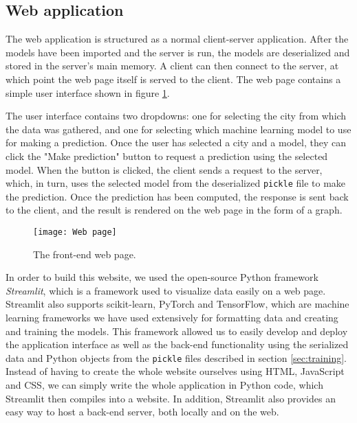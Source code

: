\subsection{Web application}\label{sec:web app}
The web application is structured as a normal client-server application. 
After the models have been imported and the server is run, the models are deserialized and stored in the server's main memory.
A client can then connect to the server, at which point the web page itself is served to the client.
The web page contains a simple user interface shown in figure \ref{fig:web page}.

The user interface contains two dropdowns: one for selecting the city from which the data was gathered, and one for selecting which machine learning model to use for making a prediction.
Once the user has selected a city and a model, they can click the "Make prediction" button to request a prediction using the selected model.
When the button is clicked, the client sends a request to the server, which, in turn, uses the selected model from the deserialized \texttt{pickle} file to make the prediction. 
Once the prediction has been computed, the response is sent back to the client, and the result is rendered on the web page in the form of a graph.

\begin{figure}[t]
	\centering
	\texttt{[image: Web page]}
	\caption{The front-end web page.}
	\label{fig:web page}
\end{figure}

In order to build this website, we used the open-source Python framework \textit{Streamlit}\cite{streamlit}, which is a framework used to visualize data easily on a web page.
Streamlit also supports scikit-learn\cite{scikit-learn}, PyTorch\cite{pytorch} and TensorFlow\cite{tensorflow}, which are machine learning frameworks we have used extensively for formatting data and creating and training the models.
This framework allowed us to easily develop and deploy the application interface as well as the back-end functionality using the serialized data and Python objects from the \texttt{pickle} files described in section \ref{sec:training}.
Instead of having to create the whole website ourselves using HTML, JavaScript and CSS, we can simply write the whole application in Python code, which Streamlit then compiles into a website.
In addition, Streamlit also provides an easy way to host a back-end server, both locally and on the web.\cite{streamlit}

